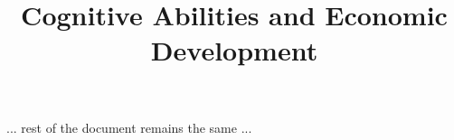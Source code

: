 \documentclass{article}
\begin{document}
\title{Cognitive Abilities and Economic Development}
\author{}
\date{}
\maketitle

... rest of the document remains the same ...
\end{document}
